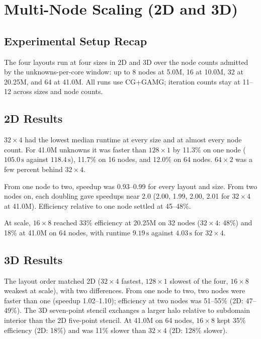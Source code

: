 \chapter{Multi-Node Scaling (2D and 3D)}
\label{ch:multinode}

\section{Experimental Setup Recap}
\label{sec:mn-setup}
The four layouts run at four sizes in 2D and 3D over the node counts admitted by the
unknowns-per-core window: up to 8 nodes at 5.0M, 16 at 10.0M, 32 at 20.25M, and 64 at
41.0M. All runs use CG+GAMG; iteration counts stay at 11--12 across sizes and node counts.

\section{2D Results}
\label{sec:2d}
$32\times4$ had the lowest median runtime at every size and at almost every node count.
For 41.0M unknowns it was faster than $128\times1$ by 11.3\% on one node
($105.0\,\text{s}$ against $118.4\,\text{s}$), 11.7\% on 16 nodes, and 12.0\% on 64 nodes.
$64\times2$ was a few percent behind $32\times4$.

From one node to two, speedup was 0.93--0.99 for every layout and size. From two nodes on,
each doubling gave speedups near 2.0 (2.00, 1.99, 2.00, 2.01 for $32\times4$ at 41.0M).
Efficiency relative to one node settled at 45--48\%.

At scale, $16\times8$ reached 33\% efficiency at 20.25M on 32 nodes ($32\times4$: 48\%) and
18\% at 41.0M on 64 nodes, with runtime $9.19\,\text{s}$ against $4.03\,\text{s}$ for
$32\times4$.

\section{3D Results}
\label{sec:3d}
The layout order matched 2D ($32\times4$ fastest, $128\times1$ slowest of the four,
$16\times8$ weakest at scale), with two differences. From one node to two, two nodes were
faster than one (speedup 1.02--1.10); efficiency at two nodes was 51--55\% (2D: 47--49\%).
The 3D seven-point stencil exchanges a larger halo relative to subdomain interior than the
2D five-point stencil. At 41.0M on 64 nodes, $16\times8$ kept 35\% efficiency (2D: 18\%)
and was 11\% slower than $32\times4$ (2D: 128\% slower).

